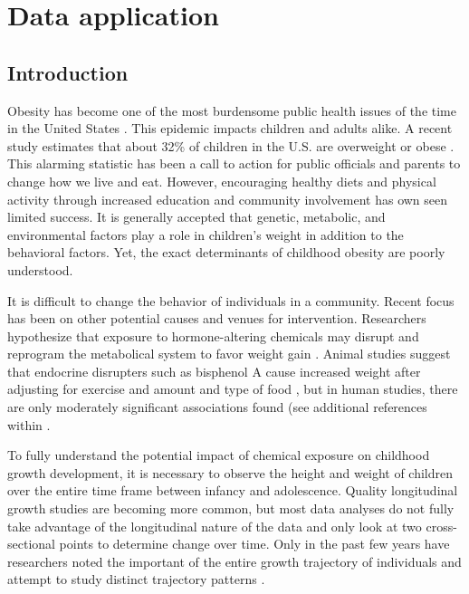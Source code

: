 \chapter{Data application}
\section{Introduction}
Obesity has become one of the most burdensome public health issues of the time in the United States \cite{surgeon2001}.  This epidemic impacts children and adults alike.  A recent study estimates that about 32\% of children in the U.S. are overweight or obese \cite{ogden2008}. This alarming statistic has been a call to action for public officials and parents to change how we live and eat. However, encouraging healthy diets and physical activity through increased education and community involvement has own seen limited success.  It is generally accepted that genetic, metabolic, and environmental factors play a role in children's weight in addition to the behavioral factors. Yet, the exact determinants of childhood obesity are poorly understood.

It is difficult to change the behavior of individuals in a community. Recent focus has been on other potential causes and venues for intervention. Researchers hypothesize that exposure to hormone-altering chemicals may disrupt and reprogram the metabolical system to favor weight gain \cite{tuma2007}. Animal studies suggest that endocrine disrupters such as bisphenol A cause increased weight after adjusting for exercise and amount and type of food \cite{rubin2001,rubin2009}, but in human studies, there are only moderately significant associations found \cite{mendez2011} (see additional references within \cite{harley2013}.
 
 To fully understand the potential impact of chemical exposure on childhood growth development, it is necessary to observe the height and weight of children over the entire time frame between infancy and adolescence. Quality longitudinal growth studies are becoming more common, but most data analyses do not fully take advantage of the longitudinal nature of the data and only look at two cross-sectional points to determine change over time. Only in the past few years have researchers noted the important of the entire growth trajectory of individuals and attempt to study distinct trajectory patterns \cite{pryor2011,carter2012,li2007,garden2012}. 

